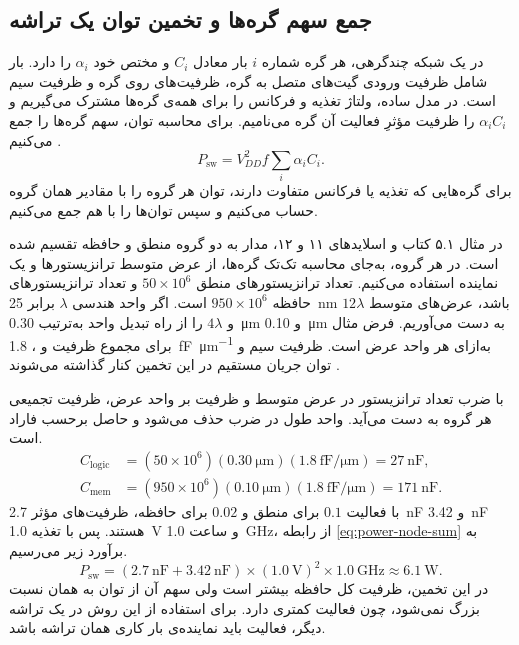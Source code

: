 \subsection{جمع سهم گره‌ها و تخمین توان یک تراشه}
\label{sec:power-effective-capacitance}

در یک شبکه چندگرهی، هر گره شماره \(i\) بار معادل \(C_i\) و
 مختص خود \(\alpha_i\) را دارد. بار شامل
ظرفیت ورودی گیت‌های متصل به گره، ظرفیت‌های  روی گره
و ظرفیت سیم است. در مدل ساده، ولتاژ تغذیه و فرکانس را برای همه‌ی گره‌ها
مشترک می‌گیریم و \(\alpha_i C_i\) را ظرفیت مؤثرِ فعالیت آن گره
می‌نامیم. برای محاسبه توان، سهم گره‌ها را جمع می‌کنیم
\cite[بخش ، صفحه ۱۸۵]{weste}.
\begin{equation}
  P_{\mathrm{sw}}=V_{DD}^2 f\sum_i\alpha_i C_i.
  \label{eq:power-node-sum}
\end{equation}
برای گره‌هایی که تغذیه یا فرکانس متفاوت دارند، توان هر گروه را با
مقادیر همان گروه حساب می‌کنیم و سپس توان‌ها را با هم جمع می‌کنیم.

در مثال ۵.۱ کتاب و اسلایدهای ۱۱ و ۱۲، مدار به دو گروه منطق و حافظه
تقسیم شده است. در هر گروه، به‌جای محاسبه تک‌تک گره‌ها، از عرض متوسط
ترانزیستورها و یک  نماینده استفاده می‌کنیم. تعداد
ترانزیستورهای منطق \(50\times10^6\) و تعداد ترانزیستورهای حافظه
\(950\times10^6\) است. اگر واحد هندسی \(\lambda\) برابر
\qty{25}{\nano\metre} باشد، عرض‌های متوسط \(12\lambda\) و
\(4\lambda\) را از راه تبدیل واحد به‌ترتیب
\qty{0.30}{\micro\metre} و \qty{0.10}{\micro\metre} به دست
می‌آوریم. فرض مثال برای مجموع ظرفیت  و ،
\qty{1.8}{\femto\farad\per\micro\metre} به‌ازای هر واحد عرض است.
ظرفیت سیم و توان جریان مستقیم در این تخمین کنار گذاشته می‌شوند
\cite[مثال ۵.۱، صفحات ۱۸۵ و ۱۸۶]{weste}
\cite[اسلایدهای ۱۱ و ۱۲]{powerslides}.

با ضرب تعداد ترانزیستور در عرض متوسط و ظرفیت بر واحد عرض، ظرفیت
تجمیعی هر گروه به دست می‌آید. واحد طول در ضرب حذف می‌شود و حاصل
برحسب فاراد است.
\[
  \begin{aligned}
    C_{\mathrm{logic}}&=(50\times10^6)(\qty{0.30}{\micro\metre})
      (\qty[per-mode=symbol]{1.8}{\femto\farad\per\micro\metre})
      =\qty{27}{\nano\farad},\\
    C_{\mathrm{mem}}&=(950\times10^6)(\qty{0.10}{\micro\metre})
      (\qty[per-mode=symbol]{1.8}{\femto\farad\per\micro\metre})
      =\qty{171}{\nano\farad}.
  \end{aligned}
\]
با فعالیت \(0.1\) برای منطق و \(0.02\) برای حافظه، ظرفیت‌های مؤثر
\qty{2.7}{\nano\farad} و \qty{3.42}{\nano\farad} هستند. پس با
تغذیه \qty{1.0}{\volt} و ساعت \qty{1.0}{\giga\hertz}، از رابطه
\eqref{eq:power-node-sum} به برآورد زیر می‌رسیم.
\[
  P_{\mathrm{sw}}=(\qty{2.7}{\nano\farad}+\qty{3.42}{\nano\farad})
                 \times(\qty{1.0}{\volt})^2\times\qty{1.0}{\giga\hertz}
                 \approx\qty{6.1}{\watt}.
\]
در این تخمین، ظرفیت کل حافظه
بیشتر است ولی سهم آن از توان به همان نسبت بزرگ نمی‌شود، چون فعالیت
کمتری دارد. برای استفاده از این روش در یک تراشه دیگر، فعالیت باید
نماینده‌ی بار کاری همان تراشه باشد.

